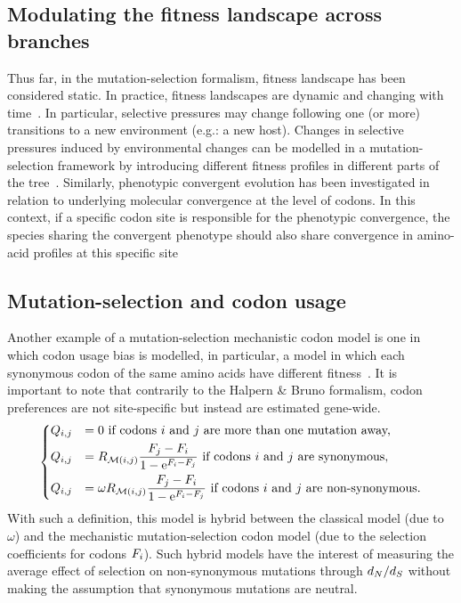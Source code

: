 \subsection{Modulating the fitness landscape across branches}
\label{subsec:modulating-the-fitness-landscape-across-branches}

Thus far, in the mutation-selection formalism, fitness landscape has been considered static.
In practice, fitness landscapes are dynamic and changing with time~\citep{Naumenko2012, Bazykin2015}.
In particular, selective pressures may change following one (or more) transitions to a new environment (e.g.: a new host).
Changes in selective pressures induced by environmental changes can be modelled in a mutation-selection framework by introducing different fitness profiles in different parts of the tree~\citep{Tamuri2009}.
Similarly, phenotypic convergent evolution has been investigated in relation to underlying molecular convergence at the level of codons.
In this context, if a specific codon site is responsible for the phenotypic convergence, the species sharing the convergent phenotype should also share convergence in amino-acid profiles at this specific site~\citep{Parto2017,Parto2018}

\subsection{Mutation-selection and codon usage}
\label{subsec:model-codon-usage}

Another example of a mutation-selection mechanistic codon model is one in which codon usage bias is modelled, in particular, a model in which each synonymous codon of the same amino acids have different fitness~\citep{Yang2008}.
It is important to note that contrarily to the Halpern \& Bruno formalism, codon preferences are not site-specific but instead are estimated gene-wide.
\begin{equation}
    \begin{dcases}
        Q_{{i}, {j}} & = 0 \text{ if codons ${i}$ and ${j}$ are more than one mutation away,} \\
        Q_{{i}, {j}} & = R_{\mathcal{M}({i}, {j})} \dfrac{F_{{j}} - F_{{i}}}{1 - \text{e}^{F_{{i}} - F_{{j}}} }\text{ if codons ${i}$ and ${j}$ are synonymous,} \\
        Q_{{i}, {j}} & = \omega R_{\mathcal{M}({i}, {j})} \dfrac{F_{{j}} - F_{{i}}}{1 - \text{e}^{F_{{i}} - F_{{j}}} } \text{ if codons ${i}$ and ${j}$ are non-synonymous}.
    \end{dcases}
    \label{eq:yang-codon-models}
\end{equation}
With such a definition, this model is hybrid between the classical model (due to $\omega$) and the mechanistic mutation-selection codon model (due to the selection coefficients for codons $F_{{i}}$).
Such hybrid models have the interest of measuring the average effect of selection on non-synonymous mutations through $d_N / d_S$ without making the assumption that synonymous mutations are neutral.



